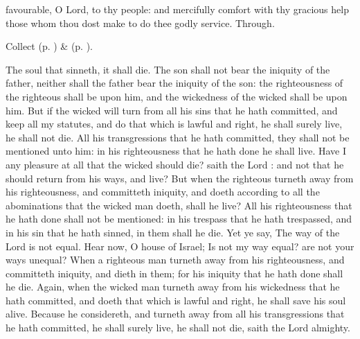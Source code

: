 \collect
{} favourable, O Lord, to thy people: and mercifully comfort with thy gracious help those whom thou dost make to do thee godly service. Through.
\begin{rubric}
     Collect  (p. \pageref{AshWednesdayMassCollect}) \&   (p. \pageref{SPLivingDeparted}).
\end{rubric}

 The soul that sinneth, it shall die. The son shall not bear the iniquity of the father, neither shall the father bear the iniquity of the son: the righteousness of the righteous shall be upon him, and the wickedness of the wicked shall be upon him. But if the wicked will turn from all his sins that he hath committed, and keep all my statutes, and do that which is lawful and right, he shall surely live, he shall not die. All his transgressions that he hath committed, they shall not be mentioned unto him: in his righteousness that he hath done he shall live. Have I any pleasure at all that the wicked should die? saith the Lord : and not that he should return from his ways, and live? But when the righteous turneth away from his righteousness, and committeth iniquity, and doeth according to all the abominations that the wicked man doeth, shall he live? All his righteousness that he hath done shall not be mentioned: in his trespass that he hath trespassed, and in his sin that he hath sinned, in them shall he die. Yet ye say, The way of the Lord is not equal. Hear now, O house of Israel; Is not my way equal? are not your ways unequal? When a righteous man turneth away from his righteousness, and committeth iniquity, and dieth in them; for his iniquity that he hath done shall he die. Again, when the wicked man turneth away from his wickedness that he hath committed, and doeth that which is lawful and right, he shall save his soul alive. Because he considereth, and turneth away from all his transgressions that he hath committed, he shall surely live, he shall not die, saith the Lord almighty.


